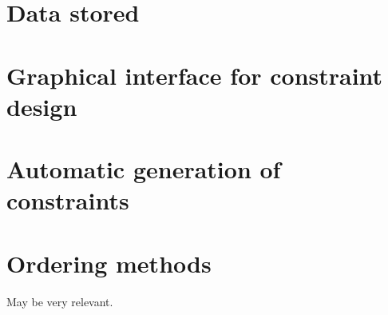 \section{Data stored}


\section{Graphical interface for constraint design}


\section{Automatic generation of constraints}


\section{Ordering methods}
May be very relevant.